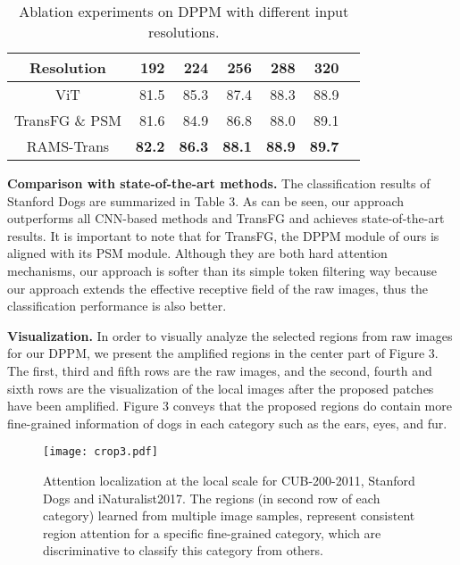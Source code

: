 \documentclass[sigconf]{acmart}
\begin{document}
\begin{table}
\caption{Ablation experiments on DPPM with different input resolutions.}
\begin{center}
\begin{tabular}{c|rrrrrr}
\hline
Resolution & 192 & 224 & 256
&288 & 320 \\
\hline\hline
ViT & 81.5 & 85.3 & 87.4 & 88.3 & 88.9 \\
TransFG \& PSM \cite{TransFG} & 81.6 & 84.9 & 86.8 & 88.0 & 89.1 \\
\hline
RAMS-Trans & \textbf{82.2} & \textbf{86.3} & \textbf{88.1} & \textbf{88.9} & \textbf{89.7} \\
\hline
\end{tabular}
\end{center}
\label{tab_ablation}
\end{table}

\textbf{Comparison with state-of-the-art methods.} The classification results of Stanford Dogs are summarized in Table 3. As can be seen, our approach outperforms all CNN-based methods and TransFG and achieves state-of-the-art results. It is important to note that for TransFG, the DPPM module of ours is aligned with its PSM module. Although they are both hard attention mechanisms, our approach is softer than its simple token filtering way because our approach extends the effective receptive field of the raw images, thus the classification performance is also better.

\textbf{Visualization.}
 In order to visually analyze the selected regions from raw images for our DPPM, we present the amplified regions in the center part of Figure 3. The first, third and fifth rows are the raw images, and the second, fourth and sixth rows are the visualization of the local images after the proposed patches have been amplified. Figure 3 conveys that the proposed regions do contain more fine-grained information of dogs in each category such as the ears, eyes, and fur.
 
 \begin{figure*}[h]
\centering
\texttt{[image: crop3.pdf]}
\caption{Attention localization at the local scale for CUB-200-2011, Stanford Dogs and iNaturalist2017. The regions (in second row of each category) learned from multiple image samples, represent consistent region attention for a specific fine-grained category, which are discriminative to classify this category from others.}
\end{figure*}
\end{document}
